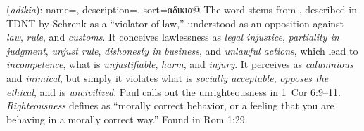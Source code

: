 \item[Unrighteousness,]

(\textit{adikia}):
{
    name=,
    description={},
    sort=αδικια@
}
The word stems from , described in TDNT by Schrenk as a ``violator of law,'' understood as an opposition against \emph{law}, \emph{rule}, and \emph{customs}. It conceives lawlessness as \emph{legal injustice}, \emph{partiality in judgment}, \emph{unjust rule}, \emph{dishonesty in business}, and \emph{unlawful actions}, which lead to \emph{incompetence}, what is \emph{unjustifiable}, \emph{harm}, and \emph{injury}. It perceives as \emph{calumnious} and \emph{inimical}, but simply it violates what is \emph{socially acceptable}, \emph{opposes the ethical}, and is \emph{uncivilized}. Paul calls out the unrighteousness in 1~Cor 6:9--11.
\emph{Righteousness} defines as ``morally correct behavior, or a feeling that you are behaving in a morally correct way.''
Found in Rom 1:29.
